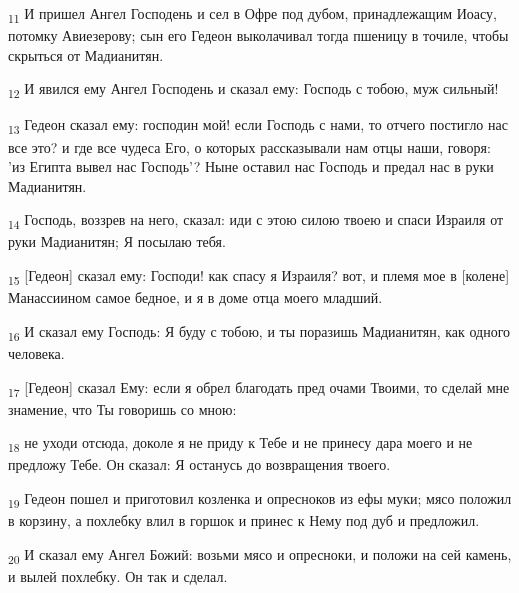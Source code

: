 \begin{tcolorbox}
\textsubscript{11} И пришел Ангел Господень и сел в Офре под дубом, принадлежащим Иоасу, потомку Авиезерову; сын его Гедеон выколачивал тогда пшеницу в точиле, чтобы скрыться от Мадианитян.
\end{tcolorbox}
\begin{tcolorbox}
\textsubscript{12} И явился ему Ангел Господень и сказал ему: Господь с тобою, муж сильный!
\end{tcolorbox}
\begin{tcolorbox}
\textsubscript{13} Гедеон сказал ему: господин мой! если Господь с нами, то отчего постигло нас все это? и где все чудеса Его, о которых рассказывали нам отцы наши, говоря: 'из Египта вывел нас Господь'? Ныне оставил нас Господь и предал нас в руки Мадианитян.
\end{tcolorbox}
\begin{tcolorbox}
\textsubscript{14} Господь, воззрев на него, сказал: иди с этою силою твоею и спаси Израиля от руки Мадианитян; Я посылаю тебя.
\end{tcolorbox}
\begin{tcolorbox}
\textsubscript{15} [Гедеон] сказал ему: Господи! как спасу я Израиля? вот, и племя мое в [колене] Манассиином самое бедное, и я в доме отца моего младший.
\end{tcolorbox}
\begin{tcolorbox}
\textsubscript{16} И сказал ему Господь: Я буду с тобою, и ты поразишь Мадианитян, как одного человека.
\end{tcolorbox}
\begin{tcolorbox}
\textsubscript{17} [Гедеон] сказал Ему: если я обрел благодать пред очами Твоими, то сделай мне знамение, что Ты говоришь со мною:
\end{tcolorbox}
\begin{tcolorbox}
\textsubscript{18} не уходи отсюда, доколе я не приду к Тебе и не принесу дара моего и не предложу Тебе. Он сказал: Я останусь до возвращения твоего.
\end{tcolorbox}
\begin{tcolorbox}
\textsubscript{19} Гедеон пошел и приготовил козленка и опресноков из ефы муки; мясо положил в корзину, а похлебку влил в горшок и принес к Нему под дуб и предложил.
\end{tcolorbox}
\begin{tcolorbox}
\textsubscript{20} И сказал ему Ангел Божий: возьми мясо и опресноки, и положи на сей камень, и вылей похлебку. Он так и сделал.
\end{tcolorbox}
